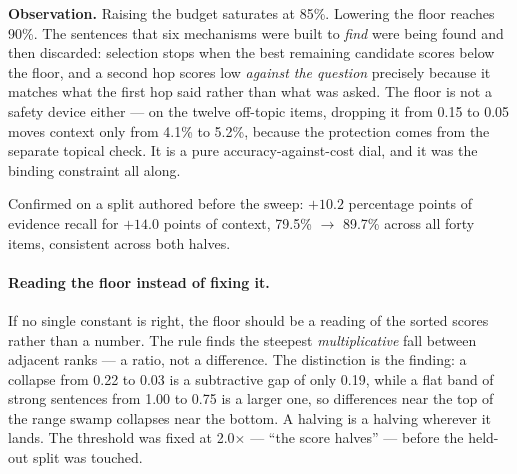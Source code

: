 \documentclass[11pt,a4paper]{article}
\newcommand{\obs}[1]{%
  \par\vspace{2pt}
  \noindent\begin{tcolorbox}[colback=soft,colframe=accent,boxrule=0pt,
    leftrule=2.2pt,arc=0pt,left=7pt,right=5pt,top=4pt,bottom=4pt,breakable]
  \small\textbf{Observation.} #1
  \end{tcolorbox}\par\vspace{2pt}}
\begin{document}
\obs{Raising the budget saturates at 85\%. Lowering the floor reaches 90\%. The
sentences that six mechanisms were built to \emph{find} were being found and
then discarded: selection stops when the best remaining candidate scores below
the floor, and a second hop scores low \emph{against the question} precisely
because it matches what the first hop said rather than what was asked. The floor
is not a safety device either --- on the twelve off-topic items, dropping it from
0.15 to 0.05 moves context only from 4.1\% to 5.2\%, because the protection
comes from the separate topical check. It is a pure accuracy-against-cost dial,
and it was the binding constraint all along.}

Confirmed on a split authored before the sweep: $+10.2$ percentage points of
evidence recall for $+14.0$ points of context, 79.5\% $\rightarrow$ 89.7\%
across all forty items, consistent across both halves.

\paragraph{Reading the floor instead of fixing it.}
If no single constant is right, the floor should be a reading of the sorted
scores rather than a number. The rule finds the steepest \emph{multiplicative}
fall between adjacent ranks --- a ratio, not a difference. The distinction is the
finding: a collapse from 0.22 to 0.03 is a subtractive gap of only 0.19, while a
flat band of strong sentences from 1.00 to 0.75 is a larger one, so differences
near the top of the range swamp collapses near the bottom. A halving is a
halving wherever it lands. The threshold was fixed at 2.0$\times$ --- ``the score
halves'' --- before the held-out split was touched.
\end{document}
